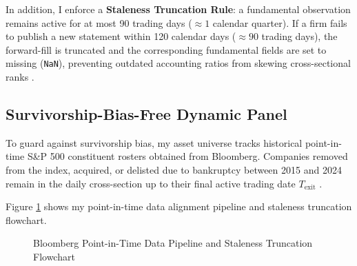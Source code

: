 In addition, I enforce a \textbf{Staleness Truncation Rule}: a fundamental observation remains active for at most 90 trading days ($\approx 1$ calendar quarter). If a firm fails to publish a new statement within 120 calendar days ($\approx 90$ trading days), the forward-fill is truncated and the corresponding fundamental fields are set to missing (\texttt{NaN}), preventing outdated accounting ratios from skewing cross-sectional ranks \citep{novy2016taxonomy}.

\subsection{Survivorship-Bias-Free Dynamic Panel}
To guard against survivorship bias, my asset universe tracks historical point-in-time S\&P 500 constituent rosters obtained from Bloomberg. Companies removed from the index, acquired, or delisted due to bankruptcy between 2015 and 2024 remain in the daily cross-section up to their final active trading date $T_{\text{exit}}$ \citep{mclean2016does, hou2020replicating}.

Figure \ref{fig:ch3_pipeline} shows my point-in-time data alignment pipeline and staleness truncation flowchart.

\begin{figure}[H]
\centering
{}
\caption{Bloomberg Point-in-Time Data Pipeline and Staleness Truncation Flowchart}
\label{fig:ch3_pipeline}
\end{figure}

